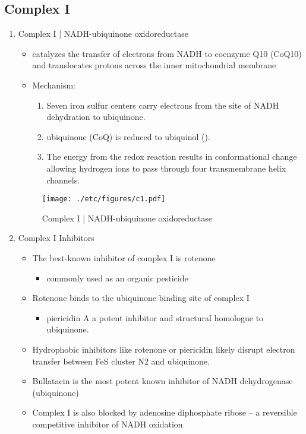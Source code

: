 \documentclass{scrartcl}
\begin{document}
\subsection{Complex I}
\label{sec:org28843da}
\begin{enumerate}
\item Complex I | NADH-ubiquinone oxidoreductase
\label{sec:org9d809bf}
\begin{itemize}
\item catalyzes the transfer of electrons from NADH to coenzyme Q10
(CoQ10) and translocates protons across the inner mitochondrial
membrane
\end{itemize}

{\small{}}

\begin{itemize}
\item Mechanism: 
\begin{enumerate}
\item Seven iron sulfur centers carry electrons from the site of NADH
dehydration to ubiquinone.

\item ubiquinone (CoQ) is reduced to ubiquinol ().

\item The energy from the redox reaction results in conformational
change allowing hydrogen ions to pass through four transmembrane
helix channels.
\end{enumerate}
\end{itemize}

\begin{figure}[htbp]
\centering
\texttt{[image: ./etc/figures/c1.pdf]}
\caption[c1]{\label{fig:org58fb386}
Complex I | NADH-ubiquinone oxidoreductase}
\end{figure}

\item Complex I Inhibitors
\label{sec:org0fa4fad}
\begin{itemize}
\item The best-known inhibitor of complex I is rotenone
\begin{itemize}
\item commonly used as an organic pesticide
\end{itemize}
\item Rotenone binds to the ubiquinone binding site of complex I
\begin{itemize}
\item piericidin A a potent inhibitor and structural homologue to ubiquinone.
\end{itemize}
\item Hydrophobic inhibitors like rotenone or piericidin likely disrupt electron transfer between FeS cluster N2 and ubiquinone.
\item Bullatacin is the most potent known inhibitor of NADH dehydrogenase (ubiquinone)
\item Complex I is also blocked by adenosine diphosphate ribose – a reversible competitive inhibitor of NADH oxidation
\end{itemize}
\end{enumerate}
\end{document}
